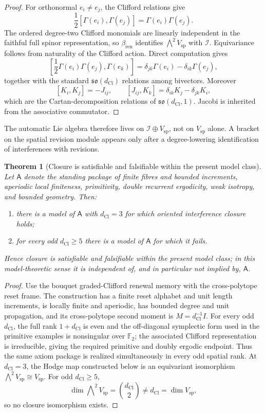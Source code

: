 \documentclass[11pt]{article}
\newtheorem{theorem}{Theorem}[section]
\theoremstyle{definition}
\theoremstyle{remark}
\newcommand{\F}{\mathbb{F}}
\newcommand{\dCl}{d_{\mathrm{Cl}}}
\newcommand{\Vsp}{V_{\mathrm{sp}}}
\newcommand{\Iint}{\mathcal{I}}
\newcommand{\bren}{\beta_{\mathrm{ren}}}
\begin{document}
\begin{proof}
For orthonormal \(e_i\ne e_j\), the Clifford relations give
\[
  \frac12[\Gamma(e_i),\Gamma(e_j)]
  =\Gamma(e_i)\Gamma(e_j).
\]
The ordered degree-two Clifford monomials are linearly independent in the
faithful full spinor representation, so \(\bren\) identifies
\(\bigwedge^2\Vsp\) with \(\Iint\). Equivariance follows from naturality of the
Clifford action. Direct computation gives
\[
 \left[\frac12\Gamma(e_i)\Gamma(e_j),\Gamma(e_k)\right]
 =\delta_{jk}\Gamma(e_i)-\delta_{ik}\Gamma(e_j),
\]
together with the standard \(\mathfrak{so}(\dCl)\) relations among bivectors.
Moreover
\[
  [K_i,K_j]=-J_{ij},\qquad
  [J_{ij},K_k]=\delta_{ik}K_j-\delta_{jk}K_i,
\]
which are the Cartan-decomposition relations of \(\mathfrak{so}(\dCl,1)\).
Jacobi is inherited from the associative commutator.
\end{proof}

The automatic Lie algebra therefore lives on
\(\Iint\oplus\Vsp\), not on \(\Vsp\) alone. A bracket on the spatial revision
module appears only after a degree-lowering identification of interferences
with revisions.

\begin{theorem}[Closure is satisfiable and falsifiable within the present model class]
\label{thm:interference-independence}
Let \(\mathsf A\) denote the standing package of finite fibres and bounded
increments, aperiodic local finiteness, primitivity, double recurrent
ergodicity, weak isotropy, and bounded geometry. Then:
\begin{enumerate}[label=\textup{(\roman*)},leftmargin=2.4em]
\item there is a model of \(\mathsf A\) with \(\dCl=3\) for which oriented
      interference closure holds;
\item for every odd \(\dCl\ge5\) there is a model of \(\mathsf A\) for which it
      fails.
\end{enumerate}
Hence closure is satisfiable and falsifiable within the present model class; in
this model-theoretic sense it is independent of, and in particular not implied
by, \(\mathsf A\).
\end{theorem}

\begin{proof}
Use the bouquet graded-Clifford renewal memory with the cross-polytope reset
frame. The construction has a finite reset alphabet and unit length increments,
is locally finite and aperiodic, has bounded degree and unit propagation, and
its cross-polytope second moment is \(M=\dCl^{-1}I\). For every odd \(\dCl\), the
full rank \(1+\dCl\) is even and the off-diagonal symplectic form used in the
primitive examples is nonsingular over \(\F_2\); the associated Clifford
representation is irreducible, giving the required primitive and doubly
ergodic endpoint. Thus the same axiom package is realized simultaneously in
every odd spatial rank. At \(\dCl=3\), the Hodge map constructed below is an
equivariant isomorphism \(\bigwedge^2\Vsp\cong\Vsp\). For odd
\(\dCl\ge5\),
\[
  \dim\bigwedge\nolimits^2\Vsp=\binom{\dCl}{2}\ne\dCl=\dim\Vsp,
\]
so no closure isomorphism exists.
\end{proof}
\end{document}
